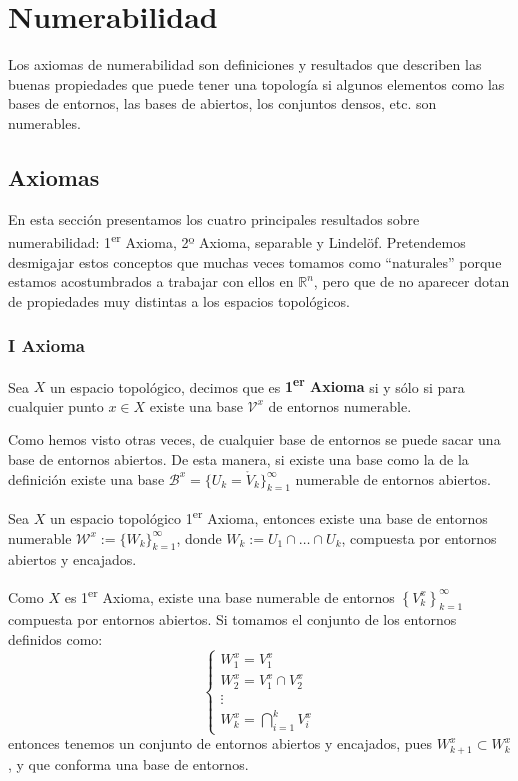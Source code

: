 \chapter{Numerabilidad}%
\label{cha:numerabilidad}
Los axiomas de numerabilidad son definiciones y resultados que describen las buenas propiedades que puede tener una topología si algunos elementos como las bases de entornos, las bases de abiertos, los conjuntos densos, etc. son numerables.

\section{Axiomas}%
\label{sec:axiomas}
En esta sección presentamos los cuatro principales resultados sobre numerabilidad: 1\textsuperscript{er} Axioma, 2º Axioma, separable y Lindelöf. Pretendemos desmigajar estos conceptos que muchas veces tomamos como ``naturales'' porque estamos acostumbrados a trabajar con ellos en $\mathbb{R}^n$, pero que de no aparecer dotan de propiedades muy distintas a los espacios topológicos.

\subsection{I Axioma}%
\label{sub:i_axioma}
\begin{defi}
Sea $X$ un espacio topológico, decimos que es \textbf{1\textsuperscript{er} Axioma} si y sólo si para cualquier punto $x\in X$ existe una base $\mathcal{V}^x$ de entornos numerable.
\end{defi}

\begin{obs}
Como hemos visto otras veces, de cualquier base de entornos se puede sacar una base de entornos abiertos. De esta manera, si existe una base como la de la definición existe una base $\mathcal{B}^x = \{U_k = \mathring{V}_k \}_{k = 1}^\infty$ numerable de entornos abiertos.
\end{obs}

\begin{prop}
Sea $X$ un espacio topológico 1\textsuperscript{er} Axioma, entonces existe una base de entornos numerable  $\mathcal{W}^x := \{W_k\}_{k = 1}^\infty$, donde $W_k := U_1 \cap \ldots \cap U_k$, compuesta por entornos abiertos y encajados.
\end{prop}
\begin{demo}
Como $X$ es 1\textsuperscript{er} Axioma, existe una base numerable de entornos $\left\{ V_k^x \right\}_{k=1}^\infty$ compuesta por entornos abiertos. Si tomamos el conjunto de los entornos definidos como:
\[
\begin{cases}
W_1^x = V_1^x \\
W_2^x = V_1^x \cap V_2^x \\
\vdots \\
W_k^x = \bigcap_{i = 1}^{k} V_i^x
\end{cases}
\]
entonces tenemos un conjunto de entornos abiertos y encajados, pues $W_{k+1}^x \subset W_{k}^x$, y que conforma una base de entornos.
\end{demo}

